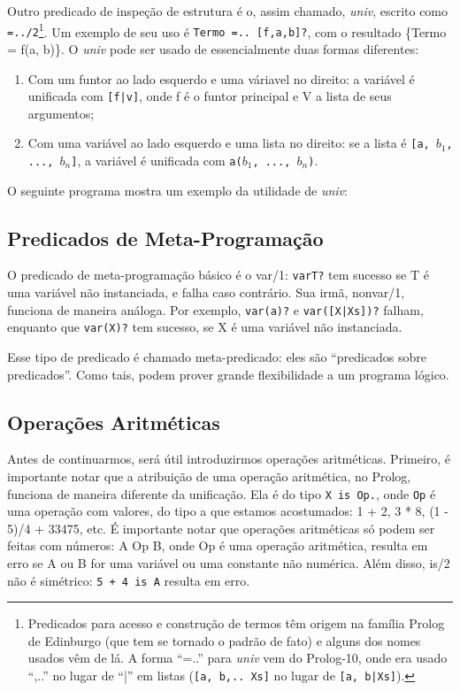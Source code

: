 \documentclass{article}
\theoremstyle{remark}
\theoremstyle{theorem}
\begin{document}
Outro predicado de inspeção de estrutura é o, assim chamado, \textit{univ}, escrito como {\tt =../2}\footnote{Predicados para acesso e construção de termos têm origem na família Prolog de Edinburgo (que tem se tornado o padrão de fato) e alguns dos nomes usados vêm de lá. A forma “=..” para \textit{univ} vem do Prolog-10, onde era usado “,..” no lugar de “|” em listas ({\tt[a, b,.. Xs]} no lugar de {\tt [a, b|Xs]}).}. Um exemplo de seu uso é {\tt Termo =.. [f,a,b]?}, com o resultado \{Termo = f(a, b)\}.
O \textit{univ} pode ser usado de essencialmente duas formas diferentes:
\begin{enumerate}
  \item Com um funtor ao lado esquerdo e uma váriavel no direito: a variável é unificada com {\tt [f|v]}, onde f é o funtor principal e V a lista de seus argumentos;
  \item Com uma variável ao lado esquerdo e uma lista no direito: se a lista é {\tt [a, $b_1$, ..., $b_n$]}, a variável é unificada com {\tt a($b_1$, ..., $b_n$)}.
\end{enumerate}

O seguinte programa mostra um exemplo da utilidade de \textit{univ}:



\subsection{Predicados de Meta-Programação}

O predicado de meta-programação básico é o var/1: {\tt var{T}?} tem sucesso se T é uma variável não instanciada, e falha caso contrário. Sua irmã, nonvar/1, funciona de maneira análoga. Por exemplo, {\tt var(a)?} e {\tt var([X|Xs])?} falham, enquanto que {\tt var(X)?} tem sucesso, se X é uma variável não instanciada.

Esse tipo de predicado é chamado meta-predicado: eles são ``predicados sobre predicados''. Como tais, podem prover grande flexibilidade a um programa lógico.


\subsection{Operações Aritméticas}


Antes de continuarmos, será útil introduzirmos operações aritméticas. Primeiro, é importante notar que a atribuição de uma operação aritmética, no Prolog, funciona de maneira diferente da unificação. Ela é do tipo {\tt X is Op.}, onde {\tt Op} é uma operação com valores, do tipo a que estamos acostumados: 1 + 2, 3 * 8, (1 - 5)/4 + 33475, etc. É importante notar que operações aritméticas só podem ser feitas com números: A Op B, onde Op é  uma operação aritmética, resulta em erro se
A ou B for uma variável ou uma constante não numérica. Além disso, is/2 não é simétrico: {\tt 5 + 4 is A} resulta em erro.
\end{document}

